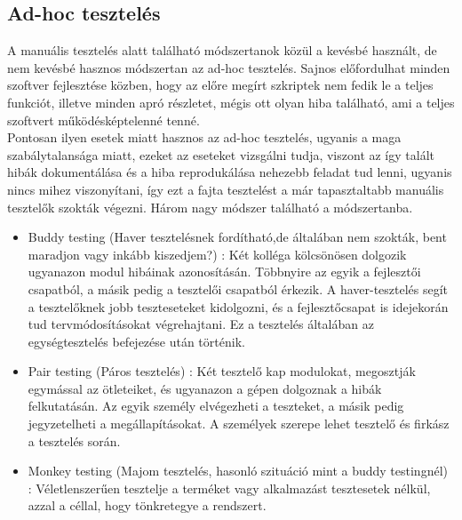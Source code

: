 \subsection{Ad-hoc tesztelés} A manuális tesztelés alatt található módszertanok közül a kevésbé használt, de nem kevésbé hasznos módszertan az ad-hoc tesztelés. Sajnos előfordulhat minden szoftver fejlesztése közben, hogy az előre megírt szkriptek nem fedik le a teljes funkciót, illetve minden apró részletet, mégis ott olyan hiba található, ami a teljes szoftvert működésképtelenné tenné.\\ Pontosan ilyen esetek miatt hasznos az ad-hoc tesztelés, ugyanis a maga szabálytalansága miatt, ezeket az eseteket vizsgálni tudja, viszont az így talált hibák dokumentálása és a hiba reprodukálása nehezebb feladat tud lenni, ugyanis nincs mihez viszonyítani, így ezt a fajta tesztelést a már tapasztaltabb manuális tesztelők szokták végezni. Három nagy módszer található a módszertanba.
\begin{itemize}
\item Buddy testing (Haver tesztelésnek fordítható,de általában nem szokták, bent maradjon vagy inkább kiszedjem?) : Két kolléga kölcsönösen dolgozik ugyanazon modul hibáinak azonosításán. Többnyire az egyik a fejlesztői csapatból, a másik pedig a tesztelői csapatból érkezik. A haver-tesztelés segít a tesztelőknek jobb teszteseteket kidolgozni, és a fejlesztőcsapat is idejekorán tud tervmódosításokat végrehajtani. Ez a tesztelés általában az egységtesztelés befejezése után történik\cite{guru99}.
\item Pair testing (Páros tesztelés) : Két tesztelő kap modulokat, megosztják egymással az ötleteiket, és ugyanazon a gépen dolgoznak a hibák felkutatásán. Az egyik személy elvégezheti a teszteket, a másik pedig jegyzetelheti a megállapításokat. A személyek szerepe lehet tesztelő és firkász a tesztelés során\cite{guru99}.
\item Monkey testing (Majom tesztelés, hasonló szituáció mint a buddy testingnél) : Véletlenszerűen tesztelje a terméket vagy alkalmazást tesztesetek nélkül, azzal a céllal, hogy tönkretegye a rendszert\cite{guru99}.
\end{itemize} 

